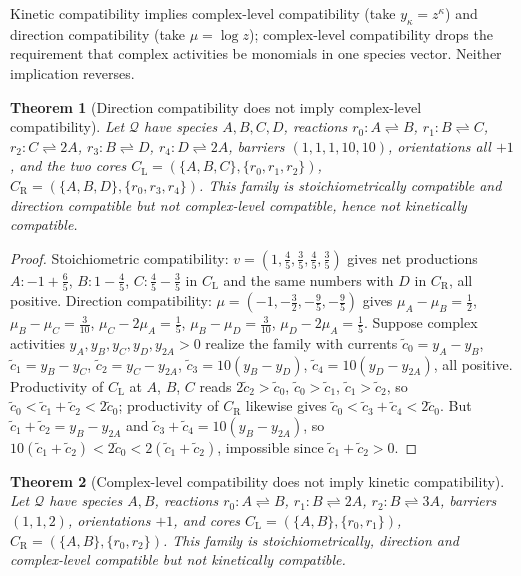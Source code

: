\documentclass[11pt,reqno]{amsart}
\theoremstyle{plain}
\newtheorem{theorem}{Theorem}[section]
\theoremstyle{definition}
\theoremstyle{remark}
\numberwithin{equation}{section}
\begin{document}
Kinetic compatibility implies complex-level compatibility (take $y_\kappa=z^\kappa$) and direction compatibility (take $\mu=\log z$); complex-level compatibility drops the requirement that complex activities be monomials in one species vector.  Neither implication reverses.

\begin{theorem}[Direction compatibility does not imply complex-level compatibility]\label{thm:magnitude}
Let $\mathcal Q$ have species $A,B,C,D$, reactions $r_0\colon A\rightleftharpoons B$, $r_1\colon B\rightleftharpoons C$, $r_2\colon C\rightleftharpoons2A$, $r_3\colon B\rightleftharpoons D$, $r_4\colon D\rightleftharpoons2A$, barriers $(1,1,1,10,10)$, orientations all $+1$, and the two cores $C_{\mathrm L}=(\{A,B,C\},\{r_0,r_1,r_2\})$, $C_{\mathrm R}=(\{A,B,D\},\{r_0,r_3,r_4\})$.  This family is stoichiometrically compatible and direction compatible but not complex-level compatible, hence not kinetically compatible.
\end{theorem}

\begin{proof}
Stoichiometric compatibility: $v=(1,\tfrac45,\tfrac35,\tfrac45,\tfrac35)$ gives net productions $A\colon-1+\tfrac65$, $B\colon1-\tfrac45$, $C\colon\tfrac45-\tfrac35$ in $C_{\mathrm L}$ and the same numbers with $D$ in $C_{\mathrm R}$, all positive.  Direction compatibility: $\mu=(-1,-\tfrac32,-\tfrac95,-\tfrac95)$ gives $\mu_A-\mu_B=\tfrac12$, $\mu_B-\mu_C=\tfrac3{10}$, $\mu_C-2\mu_A=\tfrac15$, $\mu_B-\mu_D=\tfrac3{10}$, $\mu_D-2\mu_A=\tfrac15$.  Suppose complex activities $y_A,y_B,y_C,y_D,y_{2A}>0$ realize the family with currents $\tilde c_0=y_A-y_B$, $\tilde c_1=y_B-y_C$, $\tilde c_2=y_C-y_{2A}$, $\tilde c_3=10(y_B-y_D)$, $\tilde c_4=10(y_D-y_{2A})$, all positive.  Productivity of $C_{\mathrm L}$ at $A$, $B$, $C$ reads $2\tilde c_2>\tilde c_0$, $\tilde c_0>\tilde c_1$, $\tilde c_1>\tilde c_2$, so $\tilde c_0<\tilde c_1+\tilde c_2<2\tilde c_0$; productivity of $C_{\mathrm R}$ likewise gives $\tilde c_0<\tilde c_3+\tilde c_4<2\tilde c_0$.  But $\tilde c_1+\tilde c_2=y_B-y_{2A}$ and $\tilde c_3+\tilde c_4=10(y_B-y_{2A})$, so $10(\tilde c_1+\tilde c_2)<2\tilde c_0<2(\tilde c_1+\tilde c_2)$, impossible since $\tilde c_1+\tilde c_2>0$.
\end{proof}

\begin{theorem}[Complex-level compatibility does not imply kinetic compatibility]\label{thm:toric}
Let $\mathcal Q$ have species $A,B$, reactions $r_0\colon A\rightleftharpoons B$, $r_1\colon B\rightleftharpoons2A$, $r_2\colon B\rightleftharpoons3A$, barriers $(1,1,2)$, orientations $+1$, and cores $C_{\mathrm L}=(\{A,B\},\{r_0,r_1\})$, $C_{\mathrm R}=(\{A,B\},\{r_0,r_2\})$.  This family is stoichiometrically, direction and complex-level compatible but not kinetically compatible.
\end{theorem}
\end{document}

